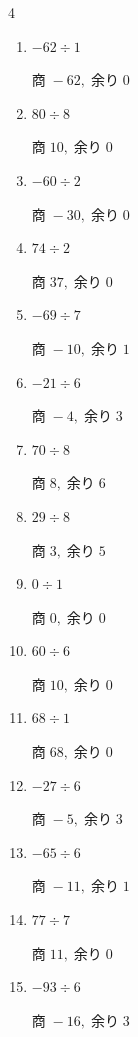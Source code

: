 \begin{multicols}{4}
\begin{enumerate}
        $商\; 15,\; 余り\; 1$

  \item $-62 \div 1$

        $商\; -62,\; 余り\; 0$

  \item $80 \div 8$

        $商\; 10,\; 余り\; 0$

  \item $-60 \div 2$

        $商\; -30,\; 余り\; 0$

  \item $74 \div 2$

        $商\; 37,\; 余り\; 0$

  \item $-69 \div 7$

        $商\; -10,\; 余り\; 1$

  \item $-21 \div 6$

        $商\; -4,\; 余り\; 3$

  \item $70 \div 8$

        $商\; 8,\; 余り\; 6$

  \item $29 \div 8$

        $商\; 3,\; 余り\; 5$

  \item $0 \div 1$

        $商\; 0,\; 余り\; 0$

  \item $60 \div 6$

        $商\; 10,\; 余り\; 0$

  \item $68 \div 1$

        $商\; 68,\; 余り\; 0$

  \item $-27 \div 6$

        $商\; -5,\; 余り\; 3$

  \item $-65 \div 6$

        $商\; -11,\; 余り\; 1$

  \item $77 \div 7$

        $商\; 11,\; 余り\; 0$

  \item $-93 \div 6$

        $商\; -16,\; 余り\; 3$


\end{enumerate}
\end{multicols}
